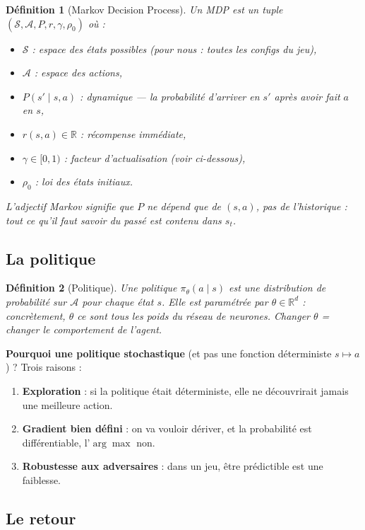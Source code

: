 \documentclass[a4paper,11pt]{article}
\theoremstyle{clean}
\newtheorem*{defn}{Définition}
\newcommand{\R}{\mathbb{R}}
\newcommand{\piT}{\pi_{\theta}}
\begin{document}
\begin{defn}[Markov Decision Process]
Un MDP est un tuple $(\mathcal{S}, \mathcal{A}, P, r, \gamma, \rho_0)$ où :
\begin{itemize}[nosep,leftmargin=1.2em]
\item $\mathcal{S}$ : espace des états possibles (pour nous : toutes les configs du jeu),
\item $\mathcal{A}$ : espace des actions,
\item $P(s'\mid s,a)$ : \emph{dynamique} --- la probabilité d'arriver en $s'$ après avoir fait $a$ en $s$,
\item $r(s,a)\in\R$ : récompense immédiate,
\item $\gamma\in[0,1)$ : facteur d'actualisation (voir ci-dessous),
\item $\rho_0$ : loi des états initiaux.
\end{itemize}
L'adjectif \emph{Markov} signifie que $P$ ne dépend que de $(s,a)$, pas de l'historique : tout ce qu'il faut savoir du passé est contenu dans $s_t$.
\end{defn}

\subsection{La politique}

\begin{defn}[Politique]
Une politique $\piT(a\mid s)$ est une distribution de probabilité sur $\mathcal{A}$ pour chaque état $s$. Elle est \emph{paramétrée} par $\theta\in\R^d$ : concrètement, $\theta$ ce sont tous les poids du réseau de neurones. Changer $\theta$ = changer le comportement de l'agent.
\end{defn}

\textbf{Pourquoi une politique stochastique} (et pas une fonction déterministe $s\mapsto a$) ? Trois raisons :
\begin{enumerate}[nosep,leftmargin=1.5em]
\item \textbf{Exploration} : si la politique était déterministe, elle ne découvrirait jamais une meilleure action.
\item \textbf{Gradient bien défini} : on va vouloir dériver, et la probabilité est différentiable, l'$\arg\max$ non.
\item \textbf{Robustesse aux adversaires} : dans un jeu, être prédictible est une faiblesse.
\end{enumerate}

\subsection{Le retour}
\end{document}
